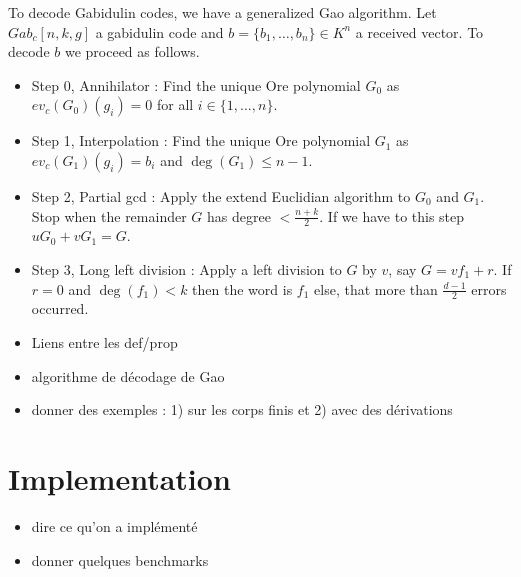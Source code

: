 \documentclass[a4paper]{llncs}
\def\todo#1{{\color{todo} #1}}
\begin{document}
To decode Gabidulin codes, we have a generalized Gao algorithm. Let $Gab_c[n,k,g]$ a gabidulin code and $b = \{b_1, \dots, b_n\} \in K^n$ a received vector. To decode $b$ we proceed as follows.

\begin{itemize}
\item Step 0, Annihilator : Find the unique Ore polynomial $G_0$ as $ev_c(G_0)(g_i) = 0$ for all $i \in \{1, \dots, n\}$.
\item Step 1, Interpolation : Find the unique Ore polynomial $G_1$ as $ev_c(G_1)(g_i) = b_i$ and $\deg(G_1) \leqslant n-1$.
\item Step 2, Partial gcd : Apply the extend Euclidian algorithm to $G_0$ and $G_1$. Stop when the remainder $G$ has degree $< \frac{n+k}{2}$. If we have to this step $uG_0 + vG_1 = G$.
\item Step 3, Long left division : Apply a left division to $G$ by $v$, say $G = vf_1 + r$. If $r =0$ and $\deg(f_1) < k$ then the word is $f_1$ else, that more than $\frac{d-1}{2}$ errors occurred. 
\end{itemize}


\todo{\begin{itemize}
\item Liens entre les def/prop
\item algorithme de décodage de Gao
\item donner des exemples : 1) sur les corps finis et 2) avec des dérivations
\end{itemize}}

\section{Implementation}

\todo{\begin{itemize}
\item dire ce qu'on a implémenté
\item donner quelques benchmarks
\end{itemize}}
\end{document}
